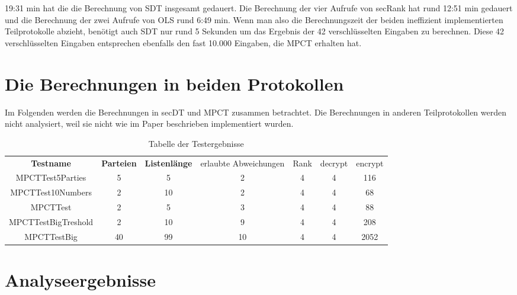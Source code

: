 19:31 min hat die die Berechnung von SDT insgesamt gedauert. Die Berechnung der vier Aufrufe von secRank hat rund 12:51 min gedauert und die Berechnung der zwei Aufrufe von OLS rund 6:49 min. Wenn man also die Berechnungszeit der beiden ineffizient implementierten Teilprotokolle abzieht, benötigt auch SDT nur rund 5 Sekunden um das Ergebnis der 42 verschlüsselten Eingaben zu berechnen. Diese 42 verschlüsselten Eingaben entsprechen ebenfalls den fast 10.000 Eingaben, die MPCT erhalten hat.


\section{Die Berechnungen in beiden Protokollen}
Im Folgenden werden die Berechnungen in secDT und MPCT zusammen betrachtet.
Die Berechnungen in anderen Teilprotokollen werden nicht analysiert, weil sie nicht wie im Paper \cite{Doettling2021} beschrieben implementiert wurden.

   \begin{table}[!h]
     \centering
     \begin{tabular}{ccccccc}
       \textbf{Testname} & \textbf{Parteien} & \textbf{Listenlänge} & erlaubte Abweichungen & Rank & decrypt & encrypt \\
       MPCTTest5Parties & 5 & 5 & 2 & 4 & 4 & 116\\
       MPCTTest10Numbers & 2 & 10 & 2 & 4 & 4 & 68\\
       MPCTTest & 2 & 5 & 3 & 4 & 4 & 88\\
       MPCTTestBigTreshold & 2 & 10 & 9 & 4 & 4 & 208\\
       MPCTTestBig &40 & 99 & 10 & 4 & 4 & 2052\\
     \end{tabular}

     \caption{Tabelle der Testergebnisse}
     \label{tbl:results}

   \end{table}
   
\section{Analyseergebnisse}

